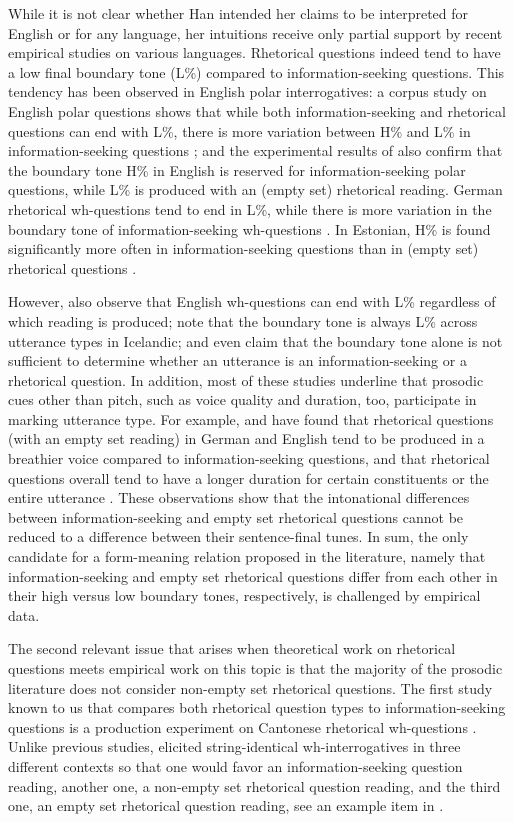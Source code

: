 \documentclass[output=paper,colorlinks,citecolor=brown            ,chinesefont]{langscibook}
\begin{document}
While it is not clear whether Han intended her claims to be interpreted for English or for any language, her intuitions receive only partial support by recent empirical studies on various languages. Rhetorical questions indeed tend to have a low final boundary tone (L\%) compared to information-seeking questions. This tendency has been observed in English polar interrogatives: a corpus study on English polar questions shows that while both information-seeking and rhetorical questions can end with L\%, there is more variation between H\% and L\% in information-seeking questions \citep{Banuazizi+1999}; and the experimental results of \citet{Dehe+2019} also confirm that the boundary tone H\% in English is reserved for information-seeking polar questions, while L\% is produced with an (empty set) rhetorical reading. German rhetorical wh-questions tend to end in L\%, while there is more variation in the boundary tone of information-seeking wh-questions \citep{Braun+2018}. In Estonian, H\% is found significantly more often in information-seeking questions than in (empty set) rhetorical questions \citep{Asu+2020}. 

However, \citet{Dehe+2019} also observe that English wh-questions can end with L\% regardless of which reading is produced; \citet{Dehe+2020} note that the boundary tone is always L\% across utterance types in Icelandic; and \citet{Braun+2018} even claim that the boundary tone alone is not sufficient to determine whether an utterance is an information-seeking or a rhetorical question. In addition, most of these studies underline that prosodic cues other than pitch, such as voice quality and duration, too, participate in marking utterance type. For example, \citet{Braun+2018} and \citet{Dehe+2019} have found that rhetorical questions (with an empty set reading) in German and English tend to be produced in a breathier voice compared to information-seeking questions, and that rhetorical questions overall tend to have a longer duration for certain constituents or the entire utterance \citep{Braun+2018, Dehe+2019, Asu+2020}. These observations show that the intonational differences between information-seeking and empty set rhetorical questions cannot be reduced to a difference between their sentence-final tunes. In sum, the only candidate for a form-meaning relation proposed in the literature, namely that information-seeking and empty set rhetorical questions differ from each other in their high versus low boundary tones, respectively, is challenged by empirical data.

The second relevant issue that arises when theoretical work on rhetorical questions meets empirical work on this topic is that the majority of the prosodic literature does not consider non-empty set rhetorical questions. The first study known to us that compares both rhetorical question types to information-seeking questions is a production experiment on Cantonese rhetorical wh-questions \citep{Lo+2019}. Unlike previous studies, \citet{Lo+2019} elicited string-identical wh-interrogatives in three different contexts so that one would favor an information-seeking question reading, another one, a non-empty set rhetorical question reading, and the third one, an empty set rhetorical question reading, see an example item in .
\end{document}
